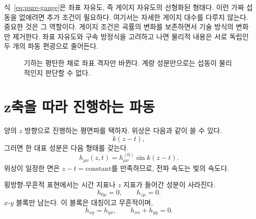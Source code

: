 식~\eqref{eq:pure-gauge}은 좌표 자유도, 즉 게이지 자유도의 선형화된 형태다. 이런 가짜 섭동을 없애려면 추가 조건이 필요하다. 여기서는 자세한 게이지 대수를 다루지 않는다. 중요한 것은 그 역할이다. 게이지 조건은 곡률의 변화를 보존하면서 기술 방식의 변화만 제거한다. 좌표 자유도와 구속 방정식을 고려하고 나면 물리적 내용은 서로 독립인 두 개의 파동 편광으로 줄어든다.

\begin{figure}[htbp]
\centering
{}
\caption{기하는 평탄한 채로 좌표 격자만 바뀐다. 계량 성분만으로는 섭동이 물리적인지 판단할 수 없다.}
\end{figure}

\section{z축을 따라 진행하는 파동}

양의 \(z\) 방향으로 진행하는 평면파를 택하자. 위상은 다음과 같이 쓸 수 있다.
\begin{equation}
 k(z-t),
\end{equation}
그러면 한 대표 성분은 다음 형태를 갖는다.
\begin{equation}
 h_{\mu\nu}(z,t)
 =h_{\mu\nu}^{(0)}\sin k(z-t).
 \label{eq:plane-wave}
\end{equation}
위상이 일정한 면은 \(z-t=\text{constant}\)를 만족하므로, 전파 속도는 빛의 속도다.

횡방향-무흔적 표현에서는 시간 지표나 \(z\) 지표가 들어간 성분이 사라진다.
\begin{equation}
 h_{0\mu}=0,
 \qquad
 h_{z\mu}=0.
 \label{eq:tt-transverse}
\end{equation}
\(x\)-\(y\) 블록만 남는다. 이 블록은 대칭이고 무흔적이며,
\begin{equation}
 h_{xy}=h_{yx},
 \qquad
 h_{xx}+h_{yy}=0.
 \label{eq:tt-trace}
\end{equation}

